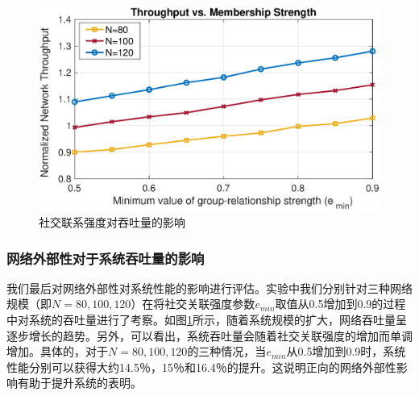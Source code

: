 \begin{figure}[htb]
\centering
\includegraphics[scale=0.58]{./pic/thp_soc_new3.eps}
\caption{社交联系强度对吞吐量的影响}\label{fg:Fig22}
\end{figure}
\subsubsection{网络外部性对于系统吞吐量的影响} 我们最后对网络外部性对系统性能的影响进行评估。实验中我们分别针对三种网络规模（即$N = 80, 100, 120$）在将社交关联强度参数$e_ {min}$取值从0.5增加到0.9的过程中对系统的吞吐量进行了考察。如图\ref{fg:Fig22}所示，随着系统规模的扩大，网络吞吐量呈逐步增长的趋势。另外，可以看出，系统吞吐量会随着社交关联强度的增加而单调增加。具体的，对于$N = 80, 100, 120$的三种情况，当$e_ {min}$从0.5增加到0.9时，系统性能分别可以获得大约14.5％，15％和16.4％的提升。这说明正向的网络外部性影响有助于提升系统的表明。

